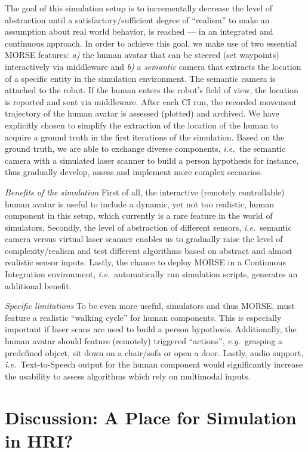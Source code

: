 \documentclass[conference]{IEEEtran}
\newcommand{\eg}{{\textit{e.g.~}}}
\newcommand{\ie}{{\textit{i.e.~}}}
\begin{document}
The goal of this simulation setup is to incrementally decrease the level of
abstraction until a satisfactory/sufficient degree of ``realism'' to make an
assumption about real world behavior, is reached --- in an integrated and
continuous approach. In order to achieve this goal, we make use of two essential
MORSE features: \textit{a)} the human avatar that can be steered (set waypoints)
interactively via middleware and \textit{b)} a \emph{semantic} camera that
extracts the location of a specific entity in the simulation environment.  The
semantic camera is attached to the robot. If the human enters the robot's field
of view, the location is reported and sent via middleware. After each CI run,
the recorded movement trajectory of the human avatar is assessed (plotted) and
archived. We have explicitly chosen to simplify the extraction of the location
of the human to acquire a ground truth in the first iterations of the
simulation. Based on the ground truth, we are able to exchange diverse
components, \ie the semantic camera with a simulated laser scanner to build a
person hypothesis for instance, thus gradually develop, assess and implement
more complex scenarios. 

\emph{Benefits of the simulation} First of all, the interactive (remotely
controllable) human avatar is useful to include a dynamic, yet not too
realistic, human component in this setup, which currently is a rare feature in
the world of simulators. Secondly, the level of abstraction of different
sensors, \ie semantic camera versus virtual laser scanner enables us to
gradually raise the level of complexity/realism and test different algorithms
based on abstract and almost realistic sensor inputs.  Lastly, the chance to
deploy MORSE in a Continuous Integration environment, \ie automatically run
simulation scripts, generates an additional benefit.
 
\emph{Specific limitations} To be even more useful, simulators and thus MORSE, must
feature a realistic ``walking cycle'' for human components. This is especially
important if laser scans are used to build a person hypothesis. Additionally, the
human avatar should feature (remotely) triggered ``actions'', \eg grasping a 
predefined object, sit down on a chair/sofa or open a door. Lastly, audio support, 
\ie Text-to-Speech output for the human component would significantly increase
the usability to assess algorithms which rely on multimodal inputs.  

\section{Discussion: A Place for Simulation in HRI?}
\end{document}
